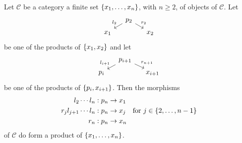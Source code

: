 \begin{proposition}\label{proposition:FiniteProdLeftCons}
  Let \(\mathcal{C}\) be a category a finite set \(\left\{x_1, \dots{}, x_n\right\}\),
  with \(n \ge 2\), of objects of \(\mathcal{C}\). Let
  \[\begin{tikzcd}[row sep=tiny, column sep=small]
      & p_2 \ar["{l_2}", dl, swap] \ar["{r_2}", dr] \\
      x_1 & & x_2 \end{tikzcd}\] be one of the products of
  \(\left\{x_1, x_2\right\}\) and let
  \[\begin{tikzcd}[row sep=tiny, column sep=small]
      & p_{i+1} \ar["{l_{i+1}}", dl, swap] \ar["{r_{n+1}}", dr] \\
      p_i & & x_{i+1}
    \end{tikzcd}\] be one of the products of \(\left\{p_i, x_{i+1}\right\}\).
%
%
  Then the morphisms
  \[\begin{aligned}
    l_2 \cdots{} l_n &: p_n \to x_1 \\
    r_j l_{j+1} \cdots{} l_n &: p_n \to x_j \quad \text{for } j \in \left\{2, \dots{}, n-1\right\} \\
    r_n &: p_n \to x_n
  \end{aligned}\]
of \(\mathcal{C}\) do form a product of \(\left\{x_1, \dots{}, x_n\right\}\).
\end{proposition}

